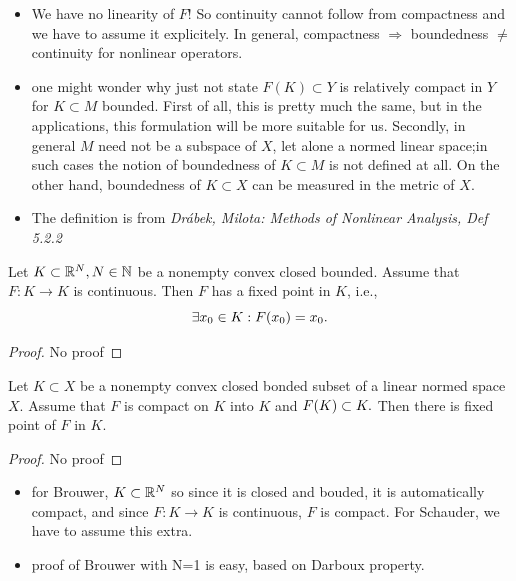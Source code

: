 \documentclass{article}
\begin{document}
\begin{remark}

	\begin{itemize}
		\item	We have no linearity of $F$! So continuity cannot follow from compactness and we have to assume it explicitely. In general, compactness $\Rightarrow $ boundedness $\neq$ continuity for nonlinear operators.
		\item one might wonder why just not state $F(K) \subset Y$ is relatively compact in $Y$ for $K \subset M $ bounded. First of all, this is pretty much the same, but in the applications, this formulation will be more suitable for us. Secondly, in general $M$ need not be a subspace of $X$, let alone a normed linear space;in such cases the notion of boundedness of $K \subset M$ is not defined at all. On the other hand, boundedness of $K \subset X$ can be measured in the metric of $X.$
		\item	The definition is from \textit{Drábek, Milota: Methods of Nonlinear Analysis, Def 5.2.2}
	\end{itemize}
\end{remark}

\begin{theorem}
	Let $K \subset {\mathbb R}^N, N \in {\mathbb N}$ be a nonempty convex closed bounded. Assume that $F: K \to K$ is continuous. Then $F$ has a fixed point in $K$, i.e.,
	\[
		\exists x_0 \in K: F\qty(x_{0}) = x_0.
	\]
\end{theorem}
\begin{proof}
	No proof
\end{proof}
\begin{theorem}
	Let $K \subset X$ be a nonempty convex closed bonded subset of a linear normed space $X$. Assume that $F$ is compact on $K$ into $K$ and $F\qty(K) \subset K.$ Then there is fixed point of $F$ in $K.$
\end{theorem}
\begin{proof}
	No proof
\end{proof}
\begin{itemize}
	\item for Brouwer, $K \subset {\mathbb R}^N$ so since it is closed and bouded, it is automatically compact, and since $F: K \to K$ is continuous, $F$ is compact. For Schauder, we have to assume this extra.
	\item proof of Brouwer with N=1 is easy, based on Darboux property.
\end{itemize}
\end{document}
